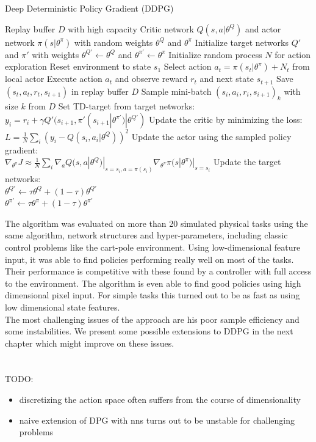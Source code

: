 \begin{algorithm}
	\caption{Deep Deterministic Policy Gradient (DDPG)}\label{DDPG-algo}
	\begin{algorithmic}
		\REQUIRE Replay buffer $\mathit{D}$ with high capacity
		\REQUIRE Critic network $Q(s,a|\theta^Q)$ and actor network $\pi(s|\theta^\pi)$ with random weights $\theta^Q$ and $\theta^\pi$
		\REQUIRE Initialize target networks $Q'$ and $\pi'$ with weights $\theta^{Q'}\leftarrow\theta^Q$ and $\theta^{\pi'}\leftarrow\theta^\pi$
		\STATE Initialize random process $\mathit{N}$ for action exploration
		\STATE Reset environment to state $s_1$
		\STATE Select action $a_t = \pi(s_t|\theta^\pi) + \mathit{N}_t$ from local actor
		\STATE Execute action $a_t$ and observe reward $r_t$ and next state $s_{t+1}$
		\STATE Save $(s_t, a_t, r_t,s_{t+1})$ in replay buffer $D$
		\STATE Sample mini-batch $(s_i, a_i, r_i,s_{i+1})_k$ with size $k$ from $D$
		\STATE Set TD-target from target networks:\\
		\qquad $y_i = r_i + \gamma Q'(s_{i+1}, \pi'(s_{i+1}|\theta^{\pi'})|\theta^{Q'})$
		\STATE Update the critic by minimizing the loss:\\
		\qquad $L=\frac{1}{N}\sum_i(y_i - Q(s_i,a_i|\theta^Q))^2$
		\STATE Update the actor using the sampled policy gradient:\\ 			\qquad $\nabla_{\theta^\pi}J \approx \frac{1}{N} \sum_i \nabla_a Q(s,a|\theta^Q)|_{s=s_i, a=\pi(s_i)}\nabla_{\theta^\pi}\pi(s|\theta^\pi)|_{s=s_i}$
		\STATE Update the target networks:\\
		\qquad $\theta^{Q'}\leftarrow \tau \theta^Q + (1-\tau)\theta^{Q'}$\\
		\qquad $\theta^{\pi'}\leftarrow \tau \theta^\pi + (1-\tau)\theta^{\pi'}$
		\ENDFOR
		\ENDFOR
	\end{algorithmic}
\end{algorithm}
The algorithm was evaluated on more than 20 simulated physical tasks using the same algorithm, network structures and hyper-parameters, including classic control problems like the cart-pole environment. Using low-dimensional feature input, it was able to find policies performing really well on most of the tasks. Their performance is competitive with these found by a controller with full access to the environment. The algorithm is even able to find good policies using high dimensional pixel input. For simple tasks this turned out to be as fast as using low dimensional state features.\\
The most challenging issues of the approach are his poor sample efficiency and some instabilities. We present some possible extensions to DDPG in the next chapter which might improve on these issues.
\\
\\
\\
TODO:
\begin{itemize}
\item discretizing the action space often suffers from the course of dimensionality
\item naive extension of DPG with nns turns out to be unstable for challenging problems
\end{itemize}


